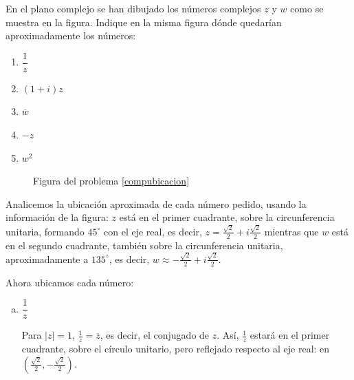 \begin{prob}\label{compubicacion}
En el plano complejo se han dibujado los números complejos $z$ y $w$ como se muestra en la figura. Indique en la misma figura dónde quedarían aproximadamente los números: 


\begin{enumerate}[$a)$]
\item $\dfrac{1}{z}$
\item $(1+i)z$
\item $\overline{w}$ 
\item $-z$ 
\item $w^2$
\end{enumerate}		
		
\begin{figure}[H]
\centering
{}
\caption{Figura del problema \ref{compubicacion}}
\end{figure}
\begin{myproof}
Analicemos la ubicación aproximada de cada número pedido, usando la información de la figura: $z$ está en el primer cuadrante, sobre la circunferencia unitaria, formando $45^\circ$ con el eje real, es decir, $z = \frac{\sqrt{2}}{2} + i\frac{\sqrt{2}}{2}$ mientras que $w$ está en el segundo cuadrante, también sobre la circunferencia unitaria, aproximadamente a $135^\circ$, es decir, $w \approx -\frac{\sqrt{2}}{2} + i\frac{\sqrt{2}}{2}$.

Ahora ubicamos cada número:

\begin{enumerate}[a)]
\item $\dfrac{1}{z}$

Para $|z|=1$, $\frac{1}{z} = \overline{z}$, es decir, el conjugado de $z$. Así, $\frac{1}{z}$ estará en el primer cuadrante, sobre el círculo unitario, pero reflejado respecto al eje real: en $(\frac{\sqrt{2}}{2}, -\frac{\sqrt{2}}{2})$.


\end{enumerate}
\end{myproof}
\end{prob}
